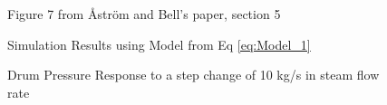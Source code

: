         \begin{figure}[ht]
            \begin{center}
                
                Figure 7 from \r{A}str\"{o}m and Bell's paper, section 5 \cite{Astrom}
                
                
                Simulation Results using Model from Eq \eqref{eq:Model_1}
                
                \caption{Drum Pressure Response to a step change of 10 kg/s in steam flow rate}
                \label{fig:Fig7D}
            \end{center}
        \end{figure}  %

